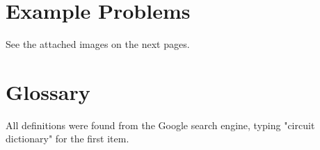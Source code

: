 \documentclass[12pt]{article}
\begin{document}
\section{Example Problems}

See the attached images on the next pages.



\section{Glossary}

All definitions were found from the Google search engine, typing "circuit dictionary" for the first item.
\end{document}
